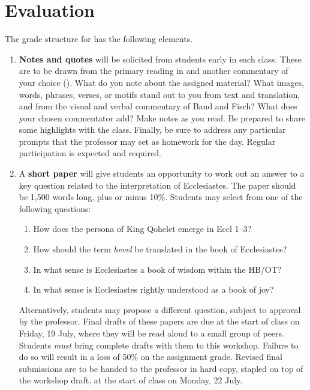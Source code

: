 \documentclass[titlepage]{article}
\begin{document}
\section{Evaluation}
\label{evaluation}

The grade structure for \ccode has the following elements.

\begin{enumerate}

	\item \textbf{Notes and quotes} will be solicited from students
	early in each class. These are to be drawn from the primary reading
	in \cite{Qohelet} and another commentary of your choice
	(\cite{TBD}). What do you note about the assigned material? What
	images, words, phrases, verses, or motifs stand out to you from text
	and translation, and from the visual and verbal commentary of Band
	and Fisch? What does your chosen commentator add? Make notes as you
	read. Be prepared to share some highlights with the class. Finally,
	be sure to address any particular prompts that the professor may set
	as homework for the day. Regular participation is expected and
	required.

	\item A \textbf{short paper} will give students an opportunity to
	work out an answer to a key question related to the interpretation
	of Ecclesiastes. The paper should be 1,500 words long, plus or minus
	10\%. Students may select from one of the following questions:

\begin{enumerate}
	\item How does the persona of King Qohelet emerge in Eccl 1–3?
	\item How should the term \emph{hevel} be translated in the book of Ecclesiastes?
	\item In what sense is Ecclesiastes a book of wisdom within the HB/OT?
	\item In what sense is Ecclesiastes rightly understood as a book of joy?
\end{enumerate}

	Alternatively, students may propose a different question, subject to
	approval by the professor. Final drafts of these papers are due at
	the start of class on Friday, 19 July, where they will be read aloud
	to a small group of peers. Students \emph{must} bring complete
	drafts with them to this workshop. Failure to do so will result in a
	loss of 50\% on the assignment grade. Revised final submissions are
	to be handed to the professor in hard copy, stapled on top of the
	workshop draft, at the start of class on Monday, 22 July.


\end{enumerate}
\end{document}
